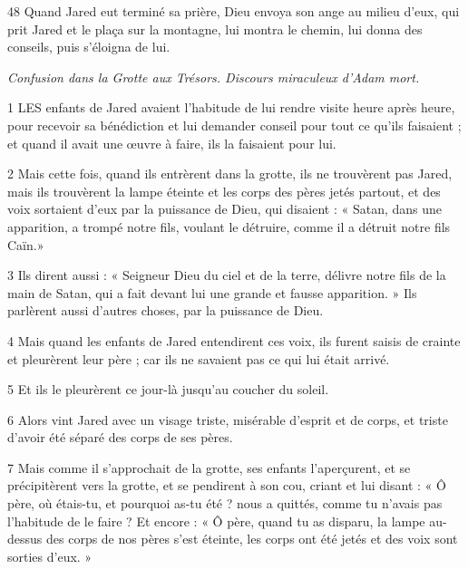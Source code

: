\par 48 Quand Jared eut terminé sa prière, Dieu envoya son ange au milieu d'eux, qui prit Jared et le plaça sur la montagne, lui montra le chemin, lui donna des conseils, puis s'éloigna de lui.


\par \textit{Confusion dans la Grotte aux Trésors. Discours miraculeux d'Adam mort.}

\par 1 LES enfants de Jared avaient l'habitude de lui rendre visite heure après heure, pour recevoir sa bénédiction et lui demander conseil pour tout ce qu'ils faisaient ; et quand il avait une œuvre à faire, ils la faisaient pour lui.

\par 2 Mais cette fois, quand ils entrèrent dans la grotte, ils ne trouvèrent pas Jared, mais ils trouvèrent la lampe éteinte et les corps des pères jetés partout, et des voix sortaient d'eux par la puissance de Dieu, qui disaient : « Satan, dans une apparition, a trompé notre fils, voulant le détruire, comme il a détruit notre fils Caïn.»

\par 3 Ils dirent aussi : « Seigneur Dieu du ciel et de la terre, délivre notre fils de la main de Satan, qui a fait devant lui une grande et fausse apparition. » Ils parlèrent aussi d'autres choses, par la puissance de Dieu.

\par 4 Mais quand les enfants de Jared entendirent ces voix, ils furent saisis de crainte et pleurèrent leur père ; car ils ne savaient pas ce qui lui était arrivé.

\par 5 Et ils le pleurèrent ce jour-là jusqu'au coucher du soleil.

\par 6 Alors vint Jared avec un visage triste, misérable d'esprit et de corps, et triste d'avoir été séparé des corps de ses pères.

\par 7 Mais comme il s'approchait de la grotte, ses enfants l'aperçurent, et se précipitèrent vers la grotte, et se pendirent à son cou, criant et lui disant : « Ô père, où étais-tu, et pourquoi as-tu été ? nous a quittés, comme tu n’avais pas l’habitude de le faire ? Et encore : « Ô père, quand tu as disparu, la lampe au-dessus des corps de nos pères s'est éteinte, les corps ont été jetés et des voix sont sorties d'eux. »

